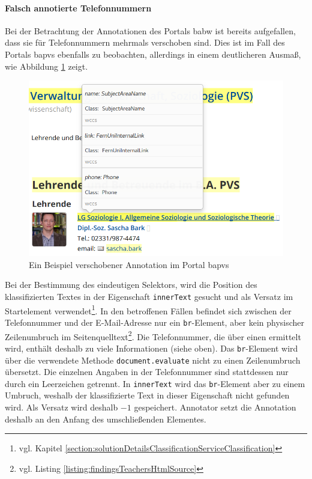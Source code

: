     \paragraph{Falsch annotierte Telefonnummern}
    Bei der Betrachtung der Annotationen des Portals \gls{babw}
    ist bereits aufgefallen, dass sie für Telefonnummern
    mehrmals verschoben sind.
    Dies ist im Fall des Portals \gls{bapvs} ebenfalls zu beobachten,
    allerdings in einem deutlicheren Ausmaß,
    wie Abbildung \ref{image:findingTeachersBaPVSWrongPhone} zeigt.

    \begin{figure}[htb]
        \centering
        \includegraphics[scale=\screenshotScaleFactor]{../resources/findings/case-study-1/bapvs/annotations/triple-annotation.png}
        \caption{Ein Beispiel verschobener Annotation im Portal \acrshort{bapvs}}
        \label{image:findingTeachersBaPVSWrongPhone}
    \end{figure}

    Bei der Bestimmung des eindeutigen Selektors,
    wird die Position des klassifizierten Textes in der Eigenschaft
    \texttt{innerText} gesucht und als Versatz im Startelement
    verwendet\footnote{vgl. Kapitel \ref{section:solutionDetailsClassificationServiceClassification}}.
    In den betroffenen Fällen befindet sich zwischen der Telefonnummer
    und der E-Mail-Adresse nur ein \texttt{br}-Element,
    aber kein physischer Zeilenumbruch im
    Seitenquelltext\footnote{vgl. Listing \ref{listing:findingsTeachersHtmlSource}}.
    Die Telefonnummer, die über einen {\xpathSelector} ermittelt wird,
    enthält deshalb zu viele Informationen (siehe oben).
    Das \texttt{br}-Element wird über die verwendete Methode \texttt{document.evaluate} nicht zu einen Zeilenumbruch übersetzt.
    Die einzelnen Angaben in der Telefonnummer sind stattdessen nur durch ein Leerzeichen getrennt.
    In \texttt{innerText} wird das \texttt{br}-Element aber zu einem Umbruch,
    weshalb der klassifizierte Text in dieser Eigenschaft nicht gefunden wird.
    Als Versatz wird deshalb $-1$ gespeichert.
    Annotator setzt die Annotation deshalb an den Anfang des umschließenden Elementes.

